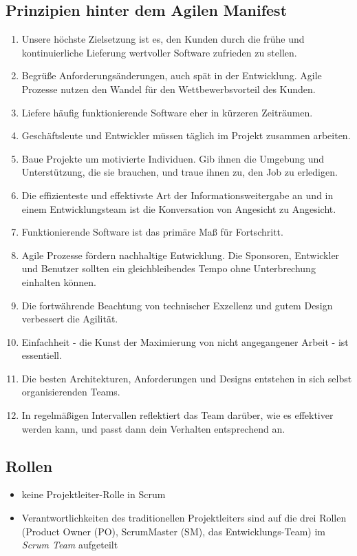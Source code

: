 \subsection{Prinzipien hinter dem Agilen Manifest}
\begin{enumerate}
  \item Unsere höchste Zielsetzung ist es, den Kunden durch die frühe und kontinuierliche
    Lieferung wertvoller Software zufrieden zu stellen.
  \item Begrüße Anforderungsänderungen, auch spät in der Entwicklung. Agile Prozesse nutzen den Wandel für den Wettbewerbsvorteil des Kunden.
  \item Liefere häufig funktionierende Software eher in kürzeren Zeiträumen.
  \item Geschäftsleute und Entwickler müssen täglich im Projekt zusammen arbeiten.
  \item Baue Projekte um motivierte Individuen. Gib ihnen die Umgebung und
    Unterstützung, die sie brauchen, und traue ihnen zu, den Job zu erledigen.
  \item Die effizienteste und effektivste Art der Informationsweitergabe an und in einem Entwicklungsteam ist die Konversation von Angesicht zu Angesicht.
  \item Funktionierende Software ist das primäre Maß für Fortschritt.
  \item Agile Prozesse fördern nachhaltige Entwicklung. Die Sponsoren, Entwickler und
    Benutzer sollten ein gleichbleibendes Tempo ohne Unterbrechung einhalten
    können.
  \item Die fortwährende Beachtung von technischer Exzellenz und gutem Design
    verbessert die Agilität.
  \item Einfachheit - die Kunst der Maximierung von nicht angegangener Arbeit - ist essentiell.
  \item Die besten Architekturen, Anforderungen und Designs entstehen in sich selbst
    organisierenden Teams.
  \item In regelmäßigen Intervallen reflektiert das Team darüber, wie es effektiver werden kann,
    und passt dann dein Verhalten entsprechend an.
\end{enumerate}


\subsection{Rollen}
\begin{itemize}
  \item keine Projektleiter-Rolle in Scrum
  \item Verantwortlichkeiten des traditionellen Projektleiters sind auf die drei Rollen (Product
    Owner (PO), ScrumMaster (SM), das Entwicklungs-Team) im \textit{Scrum Team} aufgeteilt
\end{itemize}


